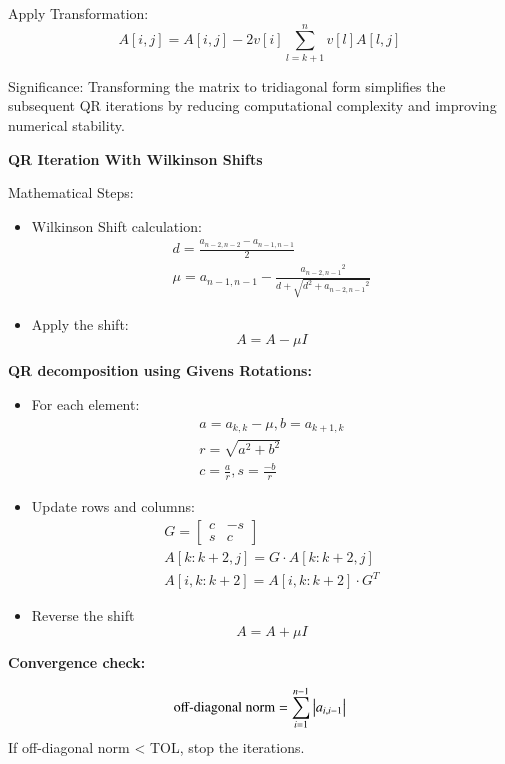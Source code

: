 \documentclass{article}
\theoremstyle{remark}
\begin{document}
    Apply Transformation:
        $$A[i,j]=A[i,j]-2v[i] \sum_{l=k+1}^n v[l]A[l,j]$$

        Significance: Transforming the matrix to tridiagonal form simplifies the subsequent QR iterations by reducing computational complexity and improving numerical stability.

\textbf{QR Iteration With Wilkinson Shifts}

    Mathematical Steps:
    \begin{itemize}
        \item Wilkinson Shift calculation:
        \begin{align*}
            d=\frac{a_{n-2,n-2}-a_{n-1,n-1}}{2} \\
            \mu = a_{n-1,n-1}-\frac{{a_{n-2,n-1}}^{2}}{d+\sqrt{d^2+{a_{n-2,n-1}}^{2}}}
        \end{align*}

        \item Apply the shift:
        $$A=A-\mu I$$
    \end{itemize}

\textbf{QR decomposition using Givens Rotations:}

\begin{itemize}
    \item For each element: 
    \begin{align*}
        a=a_{k,k}-\mu, b=a_{k+1,k} \\
        r=\sqrt{a^2 +b^2} \\
        c=\frac{a}{r}, s=\frac{-b}{r}
    \end{align*}

    \item Update rows and columns:
    \begin{align*}
        G=\begin{bmatrix} c & -s \\ s & c \end{bmatrix} \\
        A[k:k+2,j]=G \cdot A[k:k+2,j] \\
        A[i,k:k+2]=A[i,k:k+2]\cdot G^T
        
\end{align*}

    \item Reverse the shift
    $$A=A+\mu I$$

\end{itemize}

\textbf{Convergence check: }

$$\text{off-diagonal norm}=\sum_{i=1}^{n-1} \left\vert a_{i,i-1}\right\vert$$
If off-diagonal norm < TOL, stop the iterations.
\end{document}
